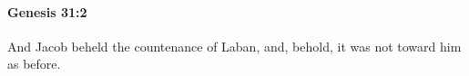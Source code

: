 
		\paragraph{Genesis 31:2} %
			\label{GENESIS-31-2}

			And Jacob beheld the countenance of Laban, and, behold, it was not toward him as before.


